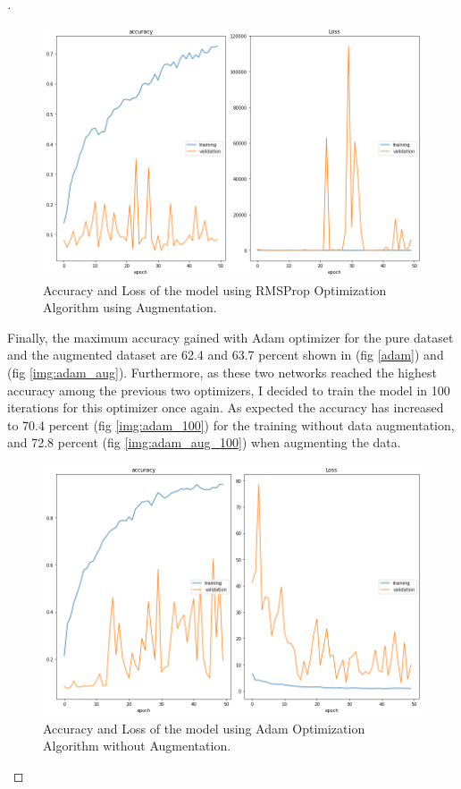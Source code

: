 \documentclass[12pt,oneside,geqno]{article}
\begin{document}
\begin{proof}[\color{red}{Solution}]
		\begin{figure}
			\centering
			\includegraphics[width=\textwidth]{../figs/rmsprop_aug_acc_loss.png}
			\caption{Accuracy and Loss of the model using RMSProp Optimization Algorithm using Augmentation.}
			\label{img:rmsprop_aug}
		\end{figure}
		
		Finally, the maximum accuracy gained with Adam optimizer for the pure dataset and the augmented dataset are 62.4 and 63.7 percent shown in (fig \ref{adam}) and (fig \ref{img:adam_aug}). Furthermore, as these two networks reached the highest accuracy among the previous two optimizers, I decided to train the model in 100 iterations for this optimizer once again. As expected the accuracy has increased to 70.4 percent (fig \ref{img:adam_100}) for the training without data augmentation, and 72.8 percent (fig \ref{img:adam_aug_100}) when augmenting the data. 
		
		\begin{figure}
			\centering
			\includegraphics[width=\textwidth]{../figs/adam_acc_loss.png}
			\caption{Accuracy and Loss of the model using Adam Optimization Algorithm without Augmentation.}
			\label{img:adam}
		\end{figure}
		

\end{proof}
\end{document}
